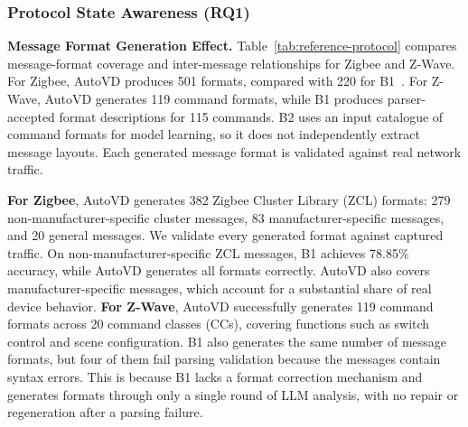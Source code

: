 \documentclass[10pt,journal,compsoc]{IEEEtran}
\DeclareRobustCommand{\rq}[1]{\textcolor{rqcolor}{\textbf{RQ#1}}}
\newcommand{\parab}[1]{\vspace{0.04in}\noindent\textbf{#1}}
\begin{document}
\subsubsection{Protocol State Awareness (\rq{1})}
\parab{Message Format Generation Effect.}
Table~\ref{tab:reference-protocol} compares message-format coverage and inter-message relationships for Zigbee and Z-Wave. For Zigbee, AutoVD produces 501 formats, compared with 220 for B1~\cite{zvdetector}. For Z-Wave, AutoVD generates 119 command formats, while B1 produces parser-accepted format descriptions for 115 commands. B2 uses an input catalogue of command formats for model learning, so it does not independently extract message layouts. Each generated message format is validated against real network traffic.


\textbf{For Zigbee}, AutoVD generates 382 Zigbee Cluster Library (ZCL) formats: 279 non-manufacturer-specific cluster messages, 83 manufacturer-specific messages, and 20 general messages. We validate every generated format against captured traffic. On non-manufacturer-specific ZCL messages, B1 achieves 78.85\% accuracy, while AutoVD generates all formats correctly. AutoVD also covers manufacturer-specific messages, which account for a substantial share of real device behavior. \textbf{For Z-Wave}, AutoVD successfully generates 119 command formats across 20 command classes (CCs), covering functions such as switch control and scene configuration. B1 also generates the same number of message formats, but four of them fail parsing validation because the messages contain syntax errors. This is because B1 lacks a format correction mechanism and generates formats through only a single round of LLM analysis, with no repair or regeneration after a parsing failure.



\end{document}

